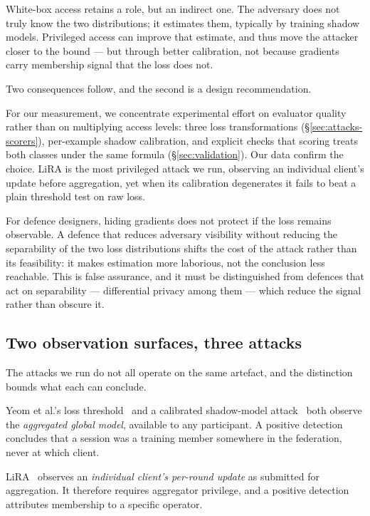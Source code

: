 White-box access retains a role, but an indirect one. The adversary does not
truly know the two distributions; it estimates them, typically by training
shadow models. Privileged access can improve that estimate, and thus move the
attacker closer to the bound --- but through better calibration, not because
gradients carry membership signal that the loss does not.

Two consequences follow, and the second is a design recommendation.

For our measurement, we concentrate experimental effort on evaluator quality
rather than on multiplying access levels: three loss transformations
(\S\ref{sec:attacks-scorers}), per-example shadow calibration, and explicit
checks that scoring treats both classes under the same formula
(\S\ref{sec:validation}). Our data confirm the choice. LiRA is the most
privileged attack we run, observing an individual client's update before
aggregation, yet when its calibration degenerates it fails to beat a plain
threshold test on raw loss.

For defence designers, hiding gradients does not protect if the loss remains
observable. A defence that reduces adversary visibility without reducing the
separability of the two loss distributions shifts the cost of the attack
rather than its feasibility: it makes estimation more laborious, not the
conclusion less reachable. This is false assurance, and it must be
distinguished from defences that act on separability --- differential privacy
among them --- which reduce the signal rather than obscure it.

\subsection{Two observation surfaces, three attacks}
\label{sec:attacks-surfaces}

The attacks we run do not all operate on the same artefact, and the
distinction bounds what each can conclude.

Yeom et al.'s loss threshold~\cite{yeom2018privacy} and a calibrated
shadow-model attack~\cite{shokri2017membership} both observe the
\emph{aggregated global model}, available to any participant. A positive
detection concludes that a session was a training member somewhere in the
federation, never at which client.

LiRA~\cite{carlini2022membership} observes an \emph{individual client's per-round
update} as submitted for aggregation. It therefore requires aggregator
privilege, and a positive detection attributes membership to a specific
operator.

